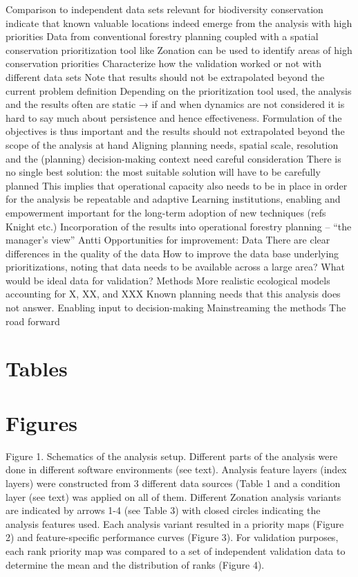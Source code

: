 \documentclass[]{article}
\begin{document}
Comparison to independent data sets relevant for biodiversity
conservation indicate that known valuable locations indeed emerge from
the analysis with high priorities Data from conventional forestry
planning coupled with a spatial conservation prioritization tool like
Zonation can be used to identify areas of high conservation priorities
Characterize how the validation worked or not with different data sets
Note that results should not be extrapolated beyond the current problem
definition Depending on the prioritization tool used, the analysis and
the results often are static → if and when dynamics are not considered
it is hard to say much about persistence and hence effectiveness.
Formulation of the objectives is thus important and the results should
not extrapolated beyond the scope of the analysis at hand Aligning
planning needs, spatial scale, resolution and the (planning)
decision-making context need careful consideration There is no single
best solution: the most suitable solution will have to be carefully
planned This implies that operational capacity also needs to be in place
in order for the analysis be repeatable and adaptive Learning
institutions, enabling and empowerment important for the long-term
adoption of new techniques (refs Knight etc.) Incorporation of the
results into operational forestry planning -- ``the manager's view''
Antti Opportunities for improvement: Data There are clear differences in
the quality of the data How to improve the data base underlying
prioritizations, noting that data needs to be available across a large
area? What would be ideal data for validation? Methods More realistic
ecological models accounting for X, XX, and XXX Known planning needs
that this analysis does not answer. Enabling input to decision-making
Mainstreaming the methods The road forward

\section{Tables}

\section{Figures}

Figure 1. Schematics of the analysis setup. Different parts of the
analysis were done in different software environments (see text).
Analysis feature layers (index layers) were constructed from 3 different
data sources (Table 1 and a condition layer (see text) was applied on
all of them. Different Zonation analysis variants are indicated by
arrows 1-4 (see Table 3) with closed circles indicating the analysis
features used. Each analysis variant resulted in a priority maps (Figure
2) and feature-specific performance curves (Figure 3). For validation
purposes, each rank priority map was compared to a set of independent
validation data to determine the mean and the distribution of ranks
(Figure 4).
\end{document}
